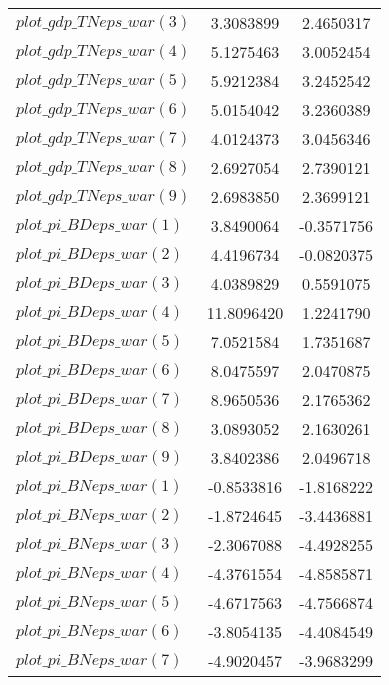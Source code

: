 \begin{center}
\begin{longtable}{lcc}
$plot\_gdp\_TN eps\_war (3)  $	 & 	      3.3083899	 & 	      2.4650317 \\ 
$plot\_gdp\_TN eps\_war (4)  $	 & 	      5.1275463	 & 	      3.0052454 \\ 
$plot\_gdp\_TN eps\_war (5)  $	 & 	      5.9212384	 & 	      3.2452542 \\ 
$plot\_gdp\_TN eps\_war (6)  $	 & 	      5.0154042	 & 	      3.2360389 \\ 
$plot\_gdp\_TN eps\_war (7)  $	 & 	      4.0124373	 & 	      3.0456346 \\ 
$plot\_gdp\_TN eps\_war (8)  $	 & 	      2.6927054	 & 	      2.7390121 \\ 
$plot\_gdp\_TN eps\_war (9)  $	 & 	      2.6983850	 & 	      2.3699121 \\ 
$plot\_pi\_BD eps\_war (1)   $	 & 	      3.8490064	 & 	     -0.3571756 \\ 
$plot\_pi\_BD eps\_war (2)   $	 & 	      4.4196734	 & 	     -0.0820375 \\ 
$plot\_pi\_BD eps\_war (3)   $	 & 	      4.0389829	 & 	      0.5591075 \\ 
$plot\_pi\_BD eps\_war (4)   $	 & 	     11.8096420	 & 	      1.2241790 \\ 
$plot\_pi\_BD eps\_war (5)   $	 & 	      7.0521584	 & 	      1.7351687 \\ 
$plot\_pi\_BD eps\_war (6)   $	 & 	      8.0475597	 & 	      2.0470875 \\ 
$plot\_pi\_BD eps\_war (7)   $	 & 	      8.9650536	 & 	      2.1765362 \\ 
$plot\_pi\_BD eps\_war (8)   $	 & 	      3.0893052	 & 	      2.1630261 \\ 
$plot\_pi\_BD eps\_war (9)   $	 & 	      3.8402386	 & 	      2.0496718 \\ 
$plot\_pi\_BN eps\_war (1)   $	 & 	     -0.8533816	 & 	     -1.8168222 \\ 
$plot\_pi\_BN eps\_war (2)   $	 & 	     -1.8724645	 & 	     -3.4436881 \\ 
$plot\_pi\_BN eps\_war (3)   $	 & 	     -2.3067088	 & 	     -4.4928255 \\ 
$plot\_pi\_BN eps\_war (4)   $	 & 	     -4.3761554	 & 	     -4.8585871 \\ 
$plot\_pi\_BN eps\_war (5)   $	 & 	     -4.6717563	 & 	     -4.7566874 \\ 
$plot\_pi\_BN eps\_war (6)   $	 & 	     -3.8054135	 & 	     -4.4084549 \\ 
$plot\_pi\_BN eps\_war (7)   $	 & 	     -4.9020457	 & 	     -3.9683299 \\ 

\end{longtable}
\end{center}
